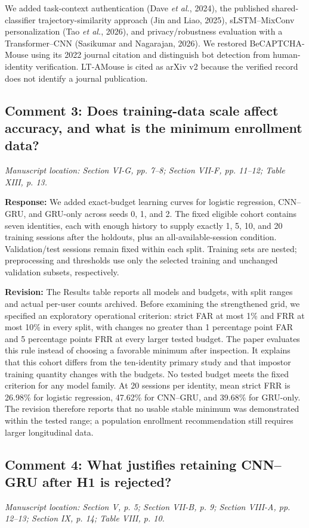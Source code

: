 \documentclass[11pt]{article}
\newcommand{\response}[1]{\par\noindent\textcolor{responseblue}{\textbf{Response:}} #1\par}
\newcommand{\change}[1]{\par\noindent\textcolor{responseblue}{\textbf{Revision:}} #1\par}
\newcommand{\location}[1]{\par\noindent\textit{Manuscript location: #1.}\par}
\begin{document}
We added task-context authentication (Dave \textit{et al.}, 2024), the published
shared-classifier trajectory-similarity approach (Jin and Liao, 2025),
sLSTM--MixConv personalization (Tao \textit{et al.}, 2026), and privacy/robustness
evaluation with a Transformer--CNN (Sasikumar and Nagarajan, 2026). We restored
BeCAPTCHA-Mouse using its 2022 journal citation and distinguish bot detection
from human-identity verification. LT-AMouse is cited as arXiv v2 because the
verified record does not identify a journal publication.

\subsection*{Comment 3: Does training-data scale affect accuracy, and what is the minimum enrollment data?}
\location{Section VI-G, pp. 7--8; Section VII-F, pp. 11--12; Table XIII, p. 13}

\response{We added exact-budget learning curves for logistic regression,
CNN--GRU, and GRU-only across seeds 0, 1, and 2. The fixed eligible cohort
contains seven identities, each with enough history to supply exactly 1, 5,
10, and 20 training sessions after the holdouts, plus an all-available-session
condition. Validation/test sessions remain fixed within each split. Training
sets are nested; preprocessing and thresholds use only the selected training
and unchanged validation subsets, respectively.}

\change{The Results table reports all models and budgets, with split ranges
and actual per-user counts archived. Before examining the strengthened grid,
we specified an exploratory operational criterion: strict FAR at most 1\%
and FRR at most 10\% in every split, with changes no greater than 1 percentage
point FAR and 5 percentage points FRR at every larger tested budget. The paper
evaluates this rule instead of choosing a favorable minimum after inspection.
It explains that this cohort differs from the ten-identity primary study and
that impostor training quantity changes with the budgets. No tested budget
meets the fixed criterion for any model family. At 20 sessions per identity,
mean strict FRR is 26.98\% for logistic regression, 47.62\% for CNN--GRU,
and 39.68\% for GRU-only. The revision therefore reports that no usable stable
minimum was demonstrated within the tested range; a population enrollment
recommendation still requires larger longitudinal data.}

\subsection*{Comment 4: What justifies retaining CNN--GRU after H1 is rejected?}
\location{Section V, p. 5; Section VII-B, p. 9; Section VIII-A, pp. 12--13; Section IX, p. 14; Table VIII, p. 10}
\end{document}
